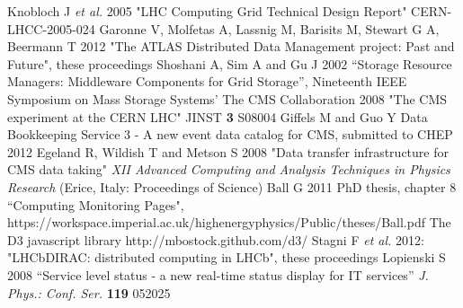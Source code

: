 \begin{thebibliography}{1}
 Knobloch J {\it et al.} 2005 "LHC Computing Grid Technical Design Report" CERN-LHCC-2005-024
 Garonne V, Molfetas A, Lassnig M, Barisits M, Stewart G A, Beermann T 2012 "The ATLAS Distributed Data Management project: Past and Future", these proceedings
 Shoshani A,  Sim A and  Gu J 2002 ``Storage Resource Managers: Middleware Components for Grid Storage'',  Nineteenth IEEE Symposium on Mass Storage Systems'
 The CMS Collaboration 2008 "The CMS experiment at the CERN LHC" JINST {\bf 3} S08004
 Giffels M and Guo Y Data Bookkeeping Service 3 - A new event data catalog for CMS, submitted to CHEP 2012
 Egeland R, Wildish T and Metson S 2008 "Data transfer infrastructure for CMS data taking" {\it XII Advanced Computing and Analysis Techniques in Physics Research} (Erice, Italy: Proceedings of Science)
 Ball G 2011 PhD thesis, chapter 8 ``Computing Monitoring Pages",
 https://workspace.imperial.ac.uk/highenergyphysics/Public/theses/Ball.pdf
 The D3 javascript library http://mbostock.github.com/d3/
 Stagni F {\it et al.} 2012: "LHCbDIRAC: distributed computing in LHCb",  these proceedings 
 Lopienski S 2008 ``Service level status - a new real-time status display for IT services'' {\it J. Phys.: Conf. Ser.}  {\bf 119} 052025



\end{thebibliography}
